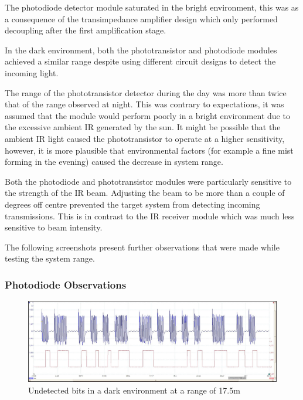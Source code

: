 The photodiode detector module saturated in the bright environment, this was as a consequence of the transimpedance amplifier design which only performed decoupling after the first amplification stage.

In the dark environment, both the phototransistor and photodiode modules achieved a similar range despite using different circuit designs to detect the incoming light.

The range of the phototransistor detector during the day was more than twice that of the range observed at night. This was contrary to expectations, it was assumed that the module would perform poorly in a bright environment due to the excessive ambient IR generated by the sun.
It might be possible that the ambient IR light caused the phototransistor to operate at a higher sensitivity, however, it is more plausible that environmental factors (for example a fine mist forming in the evening) caused the decrease in system range.

Both the photodiode and phototransistor modules were particularly sensitive to the strength of the IR beam. Adjusting the beam to be more than a couple of degrees off centre prevented the target system from detecting incoming transmissions. This is in contrast to the IR receiver module which was much less sensitive to beam intensity.

The following screenshots present further observations that were made while testing the system range. %


\subsubsection{Photodiode Observations}
\begin{figure}[H]
	\centering
	\includegraphics[width=.9\textwidth]{figures/results/drak_system_test/photodiode1750cm_missed_bits.jpg}
	\caption{Undetected bits in a dark environment at a range of 17.5m}
	\label{fig:photodiode_bit_error}
\end{figure}



